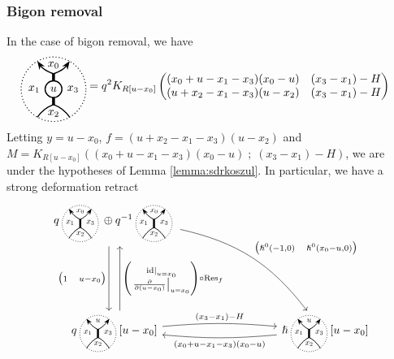 \documentclass{article}
\newcommand{\id}{\mathrm{id}}
\renewcommand{\sc}{\; ; \;}
\DeclareMathOperator{\Res}{Res}
\theoremstyle{plain} %
\theoremstyle{definition} %
\theoremstyle{remark} %
\begin{document}
\subsubsection{Bigon removal}
In the case of bigon removal, we have
\begin{align*}
\BigonStandard{u} &= q^2K_{R[u-x_0]}
    \begin{pmatrix}
    (x_0+u-x_1-x_3)(x_0-u) & (x_3-x_1)-H\\
    (u+x_2-x_1-x_3)(u-x_2) & (x_3-x_1)-H
    \end{pmatrix}
\end{align*}
Letting $y=u-x_0$, $f=(u+x_2-x_1-x_3)(u-x_2)$ and $M=K_{R[u-x_0]}((x_0+u-x_1-x_3)(x_0-u)\sc (x_3-x_1)-H)$, we are under the hypotheses of Lemma \ref{lemma:sdrkoszul}. In particular, we have a strong deformation retract
\[
\begin{tikzcd}[column sep=3cm, row sep=2cm]
    q\scalebox{0.7}{\ThickEdgeStandard}\oplus q^{-1}\scalebox{0.7}{\ThickEdgeStandard} \arrow[d, shift right=2, "{\begin{pmatrix} 1 \quad u-x_0\end{pmatrix}}", swap] \arrow[dr, bend left=20, "{\begin{pmatrix} \hslash^0(-1,0) \quad \hslash^0(x_0-u,0)\end{pmatrix}}"] 
    &\\   q\scalebox{0.7}{\ThickEdge{u}{x_1}{x_2}{x_3}}[u-x_0] \arrow[u, shift right=2, "{\begin{pmatrix} \left.\id\right|_{u=x_0} 
    \\    \left.\frac{\partial}{\partial(u-x_0)}\right|_{u=x_0}\end{pmatrix}\circ\Res_{f}}",swap]\arrow[r, "(x_3-x_1)-H", bend left=5]& \hslash\scalebox{0.7}{\ThickEdge{u}{x_1}{x_2}{x_3}}[u-x_0] \arrow[l, "(x_0+u-x_1-x_3)(x_0-u)", bend left=5]
\end{tikzcd}
\]
\end{document}

